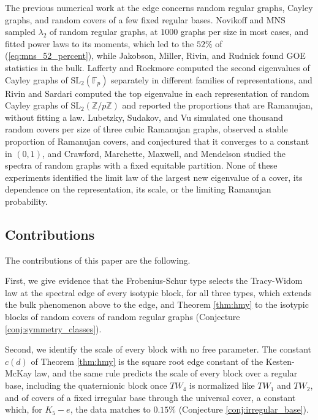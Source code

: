 \documentclass[12pt,oneside,english]{amsart}
\numberwithin{equation}{section}
\numberwithin{figure}{section}
\numberwithin{table}{section}
\theoremstyle{plain}
\numberwithin{thm}{section}
\theoremstyle{plain}
\theoremstyle{plain}
\theoremstyle{plain}
\theoremstyle{definition}
\theoremstyle{definition}
\theoremstyle{definition}
\theoremstyle{remark}
\begin{document}
The previous numerical work at the edge concerns random regular graphs,
Cayley graphs, and random covers of a few fixed regular bases. Novikoff \cite{Novikoff2002} and MNS \cite{MillerNovikoffSabelli2008}
sampled $\lambda_{2}$ of random regular graphs, at $1000$ graphs
per size in most cases, and fitted power laws to its moments, which
led to the $52\%$ of (\ref{eq:mns_52_percent}), while Jakobson, Miller,
Rivin, and Rudnick \cite{JakobsonMillerRivinRudnick1999} found GOE
statistics in the bulk. Lafferty and Rockmore \cite{LaffertyRockmore1992}
computed the second eigenvalues of Cayley graphs of $\mathrm{SL}_{2}(\mathbb{F}_{p})$
separately in different families of representations, and Rivin and
Sardari \cite{RivinSardari2019} computed the top eigenvalue in each
representation of random Cayley graphs of $\mathrm{SL}_{2}(\mathbb{Z}/p\mathbb{Z})$
and reported the proportions that are Ramanujan, without fitting a
law. Lubetzky, Sudakov, and Vu \cite{LubetzkySudakovVu2011} simulated
one thousand random covers per size of three cubic Ramanujan graphs,
observed a stable proportion of Ramanujan covers, and conjectured
that it converges to a constant in $(0,1)$, and Crawford, Marchette,
Maxwell, and Mendelson \cite{CrawfordMarchetteMaxwellMendelson2023}
studied the spectra of random graphs with a fixed equitable partition.
None of these experiments identified the limit law of the largest
new eigenvalue of a cover, its dependence on the representation, its
scale, or the limiting Ramanujan probability.

\subsection{\label{subsec:contributions}Contributions}

The contributions of this paper are the following.

First, we give evidence that the Frobenius-Schur type selects the
Tracy-Widom law at the spectral edge of every isotypic block, for
all three types, which extends the bulk phenomenon above to the edge,
and Theorem \ref{thm:hmy} to the isotypic blocks of random covers
of random regular graphs (Conjecture \ref{conj:symmetry_classes}).

Second, we identify the scale of every
block with no free parameter. The constant $c(d)$ of Theorem \ref{thm:hmy}
is the square root edge constant of the Kesten-McKay law, and the
same rule predicts the scale of every block over a regular base, including
the quaternionic block once $TW_{4}$ is normalized like $TW_{1}$
and $TW_{2}$, and of covers of a fixed irregular base through the
universal cover, a constant which, for $K_{5}-e$, the data matches
to $0.15\%$ (Conjecture \ref{conj:irregular_base}).
\end{document}
